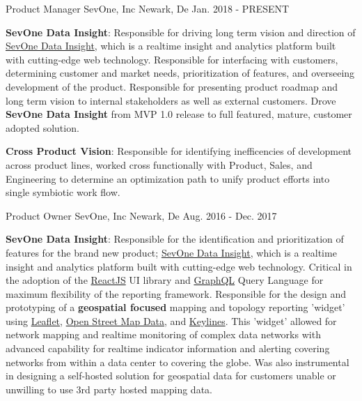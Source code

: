 \begin{cventries}
  \cventry
    {Product Manager}
    {SevOne, Inc}
    {Newark, De}
    {Jan. 2018 - PRESENT}
    {
      \begin{cvitems}
        \item{\textbf{SevOne Data Insight}: Responsible for driving long term vision and direction of \href{https://www.sevone.com/sevone-data-insight}{SevOne Data Insight}, which is a realtime insight and analytics platform built with cutting-edge web technology.  Responsible for interfacing with customers, determining customer and market needs, prioritization of features, and overseeing development of the product.  Responsible for presenting product roadmap and long term vision to internal stakeholders as well as external customers.  Drove \textbf{SevOne Data Insight} from MVP 1.0 release to full featured, mature, customer adopted solution.}
        \item{\textbf{Cross Product Vision}: Responsible for identifying inefficencies of development across product lines, worked cross functionally with Product, Sales, and Engineering to determine an optimization path to unify product efforts into single symbiotic work flow.}
      \end{cvitems}
    }

  \cventry
    {Product Owner}
    {SevOne, Inc}
    {Newark, De}
    {Aug. 2016 - Dec. 2017}
    {
      \begin{cvitems}
        \item{\textbf{SevOne Data Insight}: Responsible for the identification and prioritization of features for the brand new product; \href{https://www.sevone.com/sevone-data-insight}{SevOne Data Insight}, which is a realtime insight and analytics platform built with cutting-edge web technology.  Critical in the adoption of the \href{http://reactjs.org}{ReactJS} UI library and \href{http://graphql.org}{GraphQL} Query Language for maximum flexibility of the reporting framework. Responsible for the design and prototyping of a \textbf{geospatial focused} mapping and topology reporting 'widget' using \href{http://www.leaflet.org}{Leaflet}, \href{http://www.openstreetmap.org}{Open Street Map Data}, and \href{http://www.keylines.com}{Keylines}.  This 'widget' allowed for network mapping and realtime monitoring of complex data networks with advanced capability for realtime indicator information and alerting covering networks from within a data center to covering the globe. Was also instrumental in designing a self-hosted solution for geospatial data for customers unable or unwilling to use 3rd party hosted mapping data.}
      \end{cvitems}
    }


\end{cventries}
